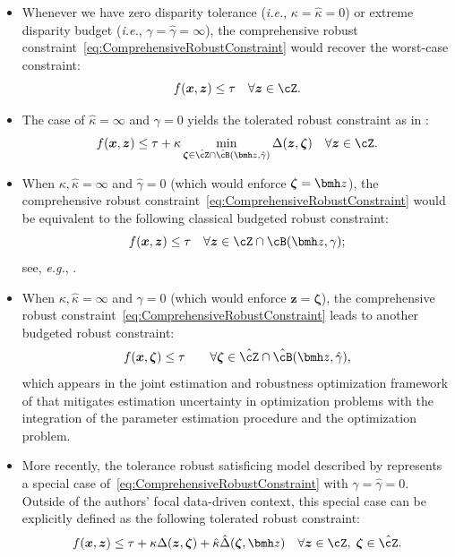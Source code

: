 \documentclass[opre, blindrev]{informs4}
\newcommand{\1}[1]{\mathds{1}{\left(#1\right)}}
\begin{document}
\begin{itemize}
\item Whenever we have zero disparity tolerance (\textit{i.e.}, $\kappa = \hat \kappa = 0$) or extreme disparity budget (\textit{i.e.}, $\gamma = \hat \gamma =\infty$),  the comprehensive robust constraint~\eqref{eq:ComprehensiveRobustConstraint} would recover the worst-case constraint:
\[
f(\bm x,\bm z) \leq \tau ~~~\forall \bm z \in \cZ.
\]

\item The case of $\hat \kappa = \infty$ and $\gamma = 0$ yields the tolerated robust constraint as in \cite{BenTal_et_al_2017globalized}:
$$
f({\bm x},{\bm z}) \leq \tau + \kappa  \min_{\bm \zeta \in \hat \cZ \cap \hat \cB(\bmh z, \hat \gamma)} \Delta(\bm z,\bm \zeta)  ~~~\forall \bm z \in \cZ.
$$

\item When $\kappa, \hat \kappa = \infty$ and $\hat \gamma=0$ (which would enforce $\bm \zeta = \bmh z$), the comprehensive robust constraint~\eqref{eq:ComprehensiveRobustConstraint} would be equivalent to the following classical budgeted robust constraint:
$$
f({\bm x},{\bm z}) \leq \tau ~~~\forall \bm z \in \cZ \cap \cB(\bmh z, \gamma);
$$ 
see, \textit{e.g.}, \cite{bertsimas2004price}.

\item When $\kappa, \hat \kappa = \infty$ and $\gamma = 0$ (which would enforce $\bm z = \bm \zeta$), the comprehensive robust constraint~\eqref{eq:ComprehensiveRobustConstraint} leads to another budgeted robust constraint:
$$
f({\bm x},{\bm \zeta}) \leq \tau \quad \quad \forall \bm \zeta \in \hat \cZ\cap \hat \cB(\bmh z, \hat \gamma),
$$
which appears in the joint estimation and robustness optimization framework of \cite{Zhu_Xie_Sim_2021joint} that mitigates estimation uncertainty in optimization problems with the integration of the parameter estimation procedure and the optimization problem.

\item More recently, the tolerance robust satisficing model described by \cite{sim2021analytics} represents a special case of~\eqref{eq:ComprehensiveRobustConstraint} with $\gamma = \hat \gamma = 0$. Outside of the authors' focal data-driven context, this special case can be explicitly defined as the following tolerated robust constraint:
$$
f(\bm x,\bm z) \leq \tau + \kappa \Delta(\bm z,\bm \zeta) + \hat \kappa \hat \Delta(\bm \zeta,\bmh z) ~~~\forall \bm z \in \cZ , \; \bm \zeta \in \hat \cZ.
$$
\end{itemize}
\end{document}
